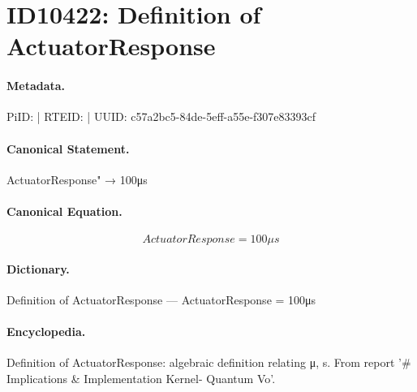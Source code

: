 \section*{ID10422: Definition of ActuatorResponse}
\paragraph{Metadata.}
PiID:  | RTEID:  | UUID: c57a2bc5-84de-5eff-a55e-f307e83393cf

\paragraph{Canonical Statement.}
ActuatorResponse" → 100μs

\paragraph{Canonical Equation.}
\[
ActuatorResponse = 100μs
\]

\paragraph{Dictionary.}
Definition of ActuatorResponse — ActuatorResponse = 100μs

\paragraph{Encyclopedia.}
Definition of ActuatorResponse: algebraic definition relating μ, s. From report '\# Implications \& Implementation Kernel- Quantum Vo'.
